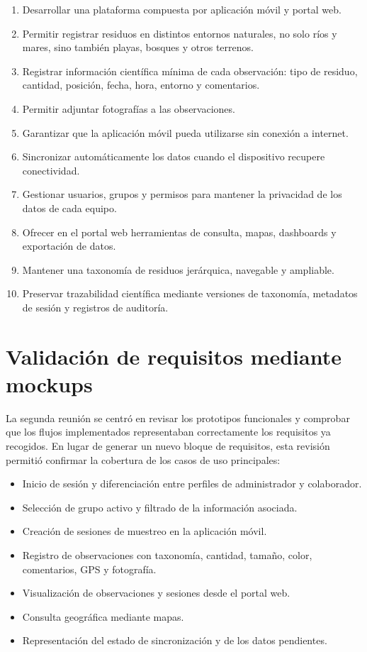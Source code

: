 \begin{enumerate}
  \item Desarrollar una plataforma compuesta por aplicación móvil y portal web.
  \item Permitir registrar residuos en distintos entornos naturales, no solo ríos y
    mares, sino también playas, bosques y otros terrenos.
  \item Registrar información científica mínima de cada observación: tipo de
    residuo, cantidad, posición, fecha, hora, entorno y comentarios.
  \item Permitir adjuntar fotografías a las observaciones.
  \item Garantizar que la aplicación móvil pueda utilizarse sin conexión a internet.
  \item Sincronizar automáticamente los datos cuando el dispositivo recupere
    conectividad.
  \item Gestionar usuarios, grupos y permisos para mantener la privacidad de los
    datos de cada equipo.
  \item Ofrecer en el portal web herramientas de consulta, mapas, dashboards y
    exportación de datos.
  \item Mantener una taxonomía de residuos jerárquica, navegable y ampliable.
  \item Preservar trazabilidad científica mediante versiones de taxonomía, metadatos
    de sesión y registros de auditoría.
\end{enumerate}

\section{Validación de requisitos mediante mockups}

La segunda reunión se centró en revisar los prototipos funcionales y comprobar que
los flujos implementados representaban correctamente los requisitos ya recogidos.
En lugar de generar un nuevo bloque de requisitos, esta revisión permitió confirmar
la cobertura de los casos de uso principales:

\begin{itemize}
  \item Inicio de sesión y diferenciación entre perfiles de administrador y
    colaborador.
  \item Selección de grupo activo y filtrado de la información asociada.
  \item Creación de sesiones de muestreo en la aplicación móvil.
  \item Registro de observaciones con taxonomía, cantidad, tamaño, color,
    comentarios, GPS y fotografía.
  \item Visualización de observaciones y sesiones desde el portal web.
  \item Consulta geográfica mediante mapas.
  \item Representación del estado de sincronización y de los datos pendientes.
\end{itemize}

